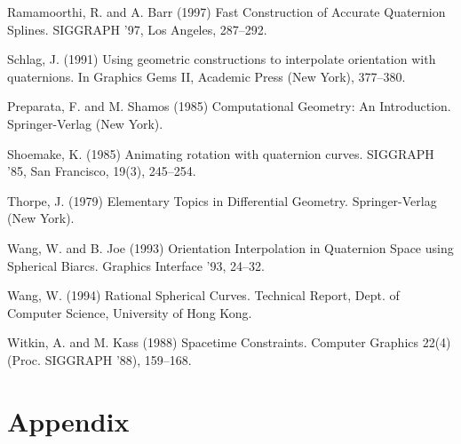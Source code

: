 \begin{thebibliography}{Lozano-Perez 83}
Ramamoorthi, R. and A. Barr (1997)
Fast Construction of Accurate Quaternion Splines.
SIGGRAPH '97, Los Angeles, 287--292.

Schlag, J. (1991) Using geometric constructions to interpolate
orientation with quaternions.  In Graphics Gems II, Academic Press (New York),
377--380.

Preparata, F. and M. Shamos (1985)
Computational Geometry: An Introduction.
Springer-Verlag (New York).

Shoemake, K. (1985) Animating rotation with quaternion curves.
SIGGRAPH '85, San Francisco, 19(3), 245--254.

Thorpe, J. (1979)
Elementary Topics in Differential Geometry.
Springer-Verlag (New York).

Wang, W. and B. Joe (1993)
Orientation Interpolation in Quaternion Space using Spherical Biarcs.
Graphics Interface '93, 24--32.

Wang, W. (1994)
Rational Spherical Curves.
Technical Report, Dept. of Computer Science, University of Hong Kong.

Witkin, A. and M. Kass (1988)
Spacetime Constraints.
Computer Graphics 22(4) (Proc. SIGGRAPH '88), 159--168.

\end{thebibliography}

\section{Appendix}

